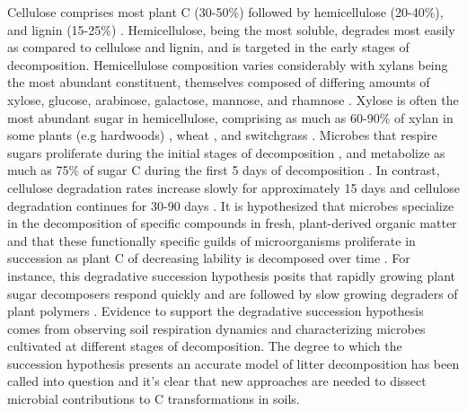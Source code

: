 Cellulose comprises most plant C (30-50\%) followed by hemicellulose (20-40\%),
and lignin (15-25\%) \citep{Lynd2002}. Hemicellulose, being the most soluble,
degrades most easily as compared to cellulose and lignin, and is targeted in
the early stages of decomposition. Hemicellulose composition varies
considerably with xylans being the most abundant constituent, themselves
composed of differing amounts of xylose, glucose, arabinose, galactose,
mannose, and rhamnose \citep{Saha2003}. Xylose is often the most abundant sugar
in hemicellulose, comprising as much as 60-90\% of xylan in some plants (e.g
hardwoods) \citep{Spiridon2008}, wheat \citep{Sun2005}, and switchgrass
\citep{Bunnell2013}. Microbes that respire sugars proliferate during the
initial stages of decomposition \citep{Garrett1951,Alexander1964}, and
metabolize as much as 75\% of sugar C during the first 5 days of decomposition
\citep{Engelking2007}. In contrast, cellulose degradation rates increase slowly
for approximately 15 days and cellulose degradation continues for 30-90 days
\citep{Hu1997,Engelking2007}. It is hypothesized that microbes specialize in
the decomposition of specific compounds in fresh, plant-derived organic matter
and that these functionally specific guilds of microorganisms proliferate in
succession as plant C of decreasing lability is decomposed over time
\citep{Hu1997,Rui2009,AnneliseHKjoller2002,Bastian2009}. For instance, this
degradative succession hypothesis posits that rapidly growing plant sugar
decomposers respond quickly \citep{Garrett1963,Bremer1994} and are followed by
slow growing degraders of plant polymers \citep{Garrett1963}. Evidence to
support the degradative succession hypothesis comes from observing soil
respiration dynamics and characterizing microbes cultivated at different stages
of decomposition. The degree to which the succession hypothesis presents an
accurate model of litter decomposition has been called into question
\citep{AnneliseHKjoller2002,Frankland1998,osono2005} and it's clear that new
approaches are needed to dissect microbial contributions to C transformations
in soils.

